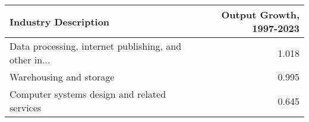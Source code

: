 \begin{tabular}{lr}
\toprule
Industry Description & Output Growth, 1997-2023 \\
\midrule
Data processing, internet publishing, and other in... & 1.018 \\
Warehousing and storage & 0.995 \\
Computer systems design and related services & 0.645 \\
\bottomrule
\end{tabular}
